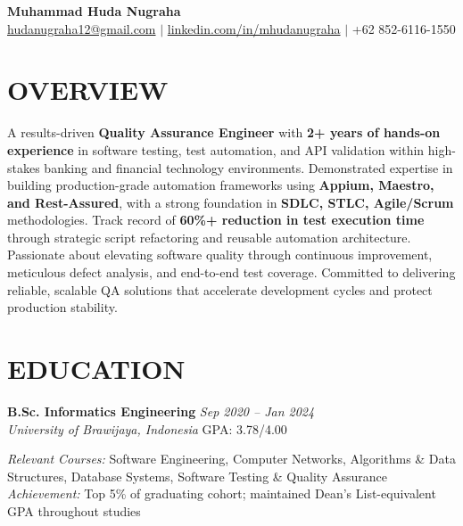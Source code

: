 \documentclass[10pt,a4paper]{article}
\newcommand{\education}[4]{%
    \noindent\textbf{#1} \hfill \textit{#2}\\
    \textit{#3} \hfill #4\vspace{2pt}
}
\begin{document}
\color{bodytext}

\begin{center}
    {\Huge\bfseries\color{secondary} Muhammad Huda Nugraha}\\[3pt]
    \href{mailto:hudanugraha12@gmail.com}{hudanugraha12@gmail.com} $\mid$
    \href{https://www.linkedin.com/in/mhudanugraha}{linkedin.com/in/mhudanugraha} $\mid$
    +62 852-6116-1550
\end{center}

\vspace{-2pt}

\section*{OVERVIEW}
\vspace{-2pt}
A results-driven \textbf{Quality Assurance Engineer} with \textbf{2+ years of hands-on experience} in software testing, test automation, and API validation within high-stakes banking and financial technology environments. Demonstrated expertise in building production-grade automation frameworks using \textbf{Appium, Maestro, and Rest-Assured}, with a strong foundation in \textbf{SDLC, STLC, Agile/Scrum} methodologies. Track record of \textbf{60\%+ reduction in test execution time} through strategic script refactoring and reusable automation architecture. Passionate about elevating software quality through continuous improvement, meticulous defect analysis, and end-to-end test coverage. Committed to delivering reliable, scalable QA solutions that accelerate development cycles and protect production stability.

\vspace{2pt}

\section*{EDUCATION}

\education{B.Sc. Informatics Engineering}{Sep 2020 -- Jan 2024}{University of Brawijaya, Indonesia}{GPA: 3.78/4.00}

\textit{Relevant Courses:} Software Engineering, Computer Networks, Algorithms \& Data Structures, Database Systems, Software Testing \& Quality Assurance\\
\textit{Achievement:} Top 5\% of graduating cohort; maintained Dean's List-equivalent GPA throughout studies

\vspace{2pt}
\end{document}
